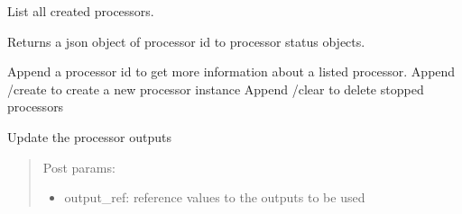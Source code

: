 \documentclass[letterpaper,10pt,english]{sphinxmanual}
\begin{document}
\begin{fulllineitems}
\label{\detokenize{src.processors:src.processors.views.processor_list}}
List all created processors.

Returns a json object of processor id to processor status objects.

Append a processor id to get more information about a listed processor.
Append /create to create a new processor instance
Append /clear to delete stopped processors

\end{fulllineitems}


\begin{fulllineitems}
\label{\detokenize{src.processors:src.processors.views.processor_outputs_update}}
Update the processor outputs
\begin{quote}

Post params:
\begin{itemize}
\item {} 
output\_ref: reference values to the outputs to be used

\end{itemize}
\end{quote}

\end{fulllineitems}

\end{document}
